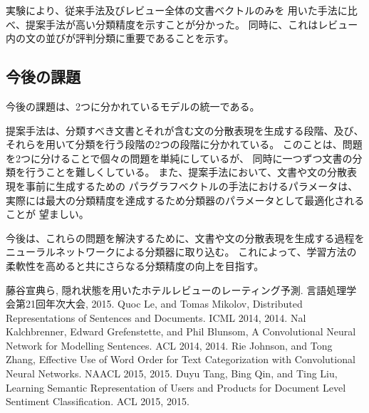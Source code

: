 \documentclass[twocolumn,a4paper]{ltjarticle}
\begin{document}
実験により、従来手法\cite{fujitani15}及びレビュー全体の文書ベクトルのみを
用いた手法に比べ、提案手法が高い分類精度を示すことが分かった。
同時に、これはレビュー内の文の並びが評判分類に重要であることを示す。



\subsection{今後の課題}

今後の課題は、2つに分かれているモデルの統一である。

提案手法は、分類すべき文書とそれが含む文の分散表現を生成する段階、及び、
それらを用いて分類を行う段階の2つの段階に分かれている。
このことは、問題を2つに分けることで個々の問題を単純にしているが、
同時に一つずつ文書の分類を行うことを難しくしている。
また、提案手法において、文書や文の分散表現を事前に生成するための
パラグラフベクトルの手法におけるパラメータは、
実際には最大の分類精度を達成するため分類器のパラメータとして最適化されることが
望ましい。

今後は、これらの問題を解決するために、文書や文の分散表現を生成する過程を
ニューラルネットワークによる分類器に取り込む。
これによって、学習方法の柔軟性を高めると共にさらなる分類精度の向上を目指す。





\begin{thebibliography}{9}
  藤谷宣典ら,
  隠れ状態を用いたホテルレビューのレーティング予測.
  言語処理学会第21回年次大会, 2015.
  Quoc Le, and Tomas Mikolov,
  Distributed Representations of Sentences and Documents.
  ICML 2014, 2014.
  Nal Kalchbrenner, Edward Grefenstette, and Phil Blunsom,
  A Convolutional Neural Network for Modelling Sentences.
  ACL 2014, 2014.
  Rie Johnson, and Tong Zhang,
  Effective Use of Word Order for Text Categorization
  with Convolutional Neural Networks.
  NAACL 2015, 2015.
  Duyu Tang, Bing Qin, and Ting Liu,
  Learning Semantic Representation of Users and Products
  for Document Level Sentiment Classification.
  ACL 2015, 2015.
\end{thebibliography}
\end{document}
